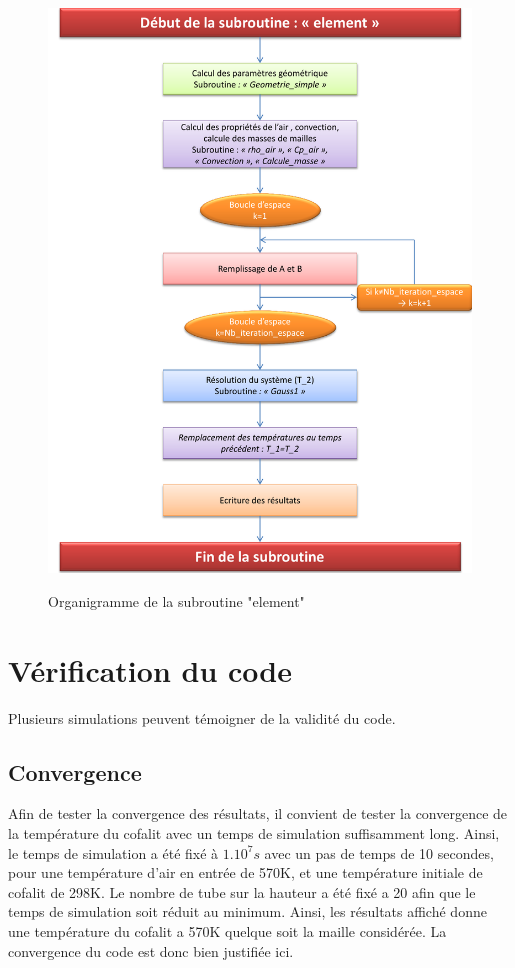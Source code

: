 \begin{figure}[!h]
	\centering
	\caption{Organigramme de la subroutine "element"}
	\includegraphics[scale=0.75]{PHOTO/Organigramme_element.pdf}
	\label{orgasme_element}
\end{figure}
	
		
	\newpage
	
	
		
		
\section{Vérification du code}		
		
Plusieurs simulations peuvent témoigner de la validité du code.

\subsection{Convergence}
		
Afin de tester la convergence des résultats, il convient de tester la convergence de la température du cofalit avec un temps de simulation suffisamment long.
Ainsi, le temps de simulation a été fixé à $1.10^{7}s$ avec un pas de temps de 10 secondes, pour une température d'air en entrée de 570K, et une température initiale de cofalit de 298K.
Le nombre de tube sur la hauteur a été fixé a 20 afin que le temps de simulation soit réduit au minimum.
Ainsi, les résultats affiché donne une température du cofalit a 570K quelque soit la maille considérée. La convergence du code est donc bien justifiée ici.

